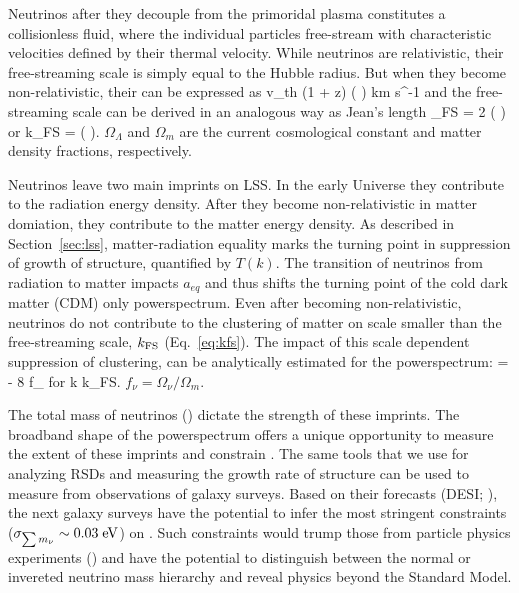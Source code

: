 Neutrinos after they decouple from the primoridal plasma constitutes a 
collisionless fluid, where the individual particles free-stream with 
characteristic velocities defined by their thermal velocity. While 
neutrinos are relativistic, their free-streaming scale is simply 
equal to the Hubble radius. But when they become non-relativistic, 
their can be expressed as
\beq
v_{\rm th}  (1 + z) \left( \right) \; \; {\rm km \; s^{-1}}
\eeq
and the free-streaming scale can be derived in an analogous way as
Jean's length
\beq
\lambda_{\rm FS} = 2 \pi {} \left(  \right)
\eeq
or 
\beq \label{eq:kfs}
k_{\rm FS} =    \left( \right).
\eeq
$\Omega_\Lambda$ and $\Omega_m$ are the current cosmological constant and matter 
density fractions, respectively.

Neutrinos leave two main imprints on LSS. In the early Universe they contribute
to the radiation energy density. After they become non-relativistic in matter
domiation, they contribute to the matter energy density. As described in 
Section~\ref{sec:lss}, matter-radiation equality marks the turning point in 
suppression of growth of structure, quantified by $T(k)$. The transition of 
neutrinos from radiation to matter impacts $a_{eq}$ and thus shifts the turning 
point of the cold dark matter (CDM) only powerspectrum. 
Even after becoming non-relativistic, neutrinos do not contribute to the
clustering of matter on scale smaller than the free-streaming scale, 
$k_{\rm FS}$ (Eq.~\ref{eq:kfs}). The impact of this scale dependent 
suppression of clustering, can be analytically estimated for the powerspectrum: 
\beq
{} =  \approx - 8 f_\nu \;\;\;\; {\rm for}\;\; k \gg k_{\rm FS}.
\eeq
$f_\nu = \Omega_\nu / \Omega_m$.

The total mass of neutrinos (\mneut) dictate the strength of these imprints. 
The broadband shape of the powerspectrum offers a unique opportunity to measure
the extent of these imprints and constrain \mneut. The same tools that we 
use for analyzing RSDs and measuring the growth rate of structure can be used 
to measure \mneut from observations of galaxy surveys.
Based on their forecasts (DESI; ), the next galaxy surveys have the
potential to infer the most stringent constraints 
($\sigma_{\sum m_\nu} \sim 0.03\;{\rm eV}$) on \mneut. Such constraints would 
trump those from particle physics experiments () and have the potential to distinguish
between the normal or invereted neutrino mass hierarchy and reveal physics
beyond the Standard Model.

